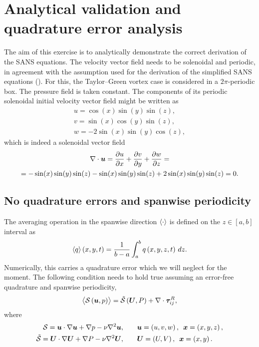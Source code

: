 \documentclass[../main.tex]{subfiles}
\begin{document}
\section{Analytical validation and quadrature error analysis}

The aim of this exercise is to analytically demonstrate the correct derivation of the SANS equations.
The velocity vector field needs to be solenoidal and periodic, in agreement with the assumption used for the derivation of the simplified SANS equations (). For this, the Taylor--Green vortex case is considered in a $2\pi$-periodic box.
The pressure field is taken constant.
The components of its periodic solenoidal initial velocity vector field might be written as
\begin{gather}
u = \cos (x) \sin (y) \sin (z), \label{eq:tg-u} \\
v = \sin (x) \cos (y) \sin (z), \\
w = -2 \sin (x) \sin (y) \cos (z),\label{eq:tg-w}
\end{gather}
which is indeed a solenoidal vector field
\begin{gather}
\nabla \cdot \boldsymbol{u} = \frac{\partial u}{\partial x}+\frac{\partial v}{\partial y}+\frac{\partial w}{\partial z}=\nonumber\\
=- \sin (x) \sin (y) \sin (z)- \sin (x) \sin (y) \sin (z)+2\sin (x) \sin (y) \sin (z)=0.
\end{gather}

\subsection{No quadrature errors and spanwise periodicity}
\label{sec:sans_analytical}

The averaging operation in the spanwise direction $\left\langle \cdot \right\rangle$ is defined on the $z\in\left[a,b\right]$ interval as
\begin{equation}
\left\langle q \right\rangle\left(x,y,t \right) = \frac{1}{b-a}\int^b_a q\left(x,y,z,t \right)\,dz.
\end{equation}
Numerically, this carries a quadrature error which we will neglect for the moment.
The following condition needs to hold true assuming an error-free quadrature and spanwise periodicity,
\begin{equation}
\left\langle \mathcal{S}\left(\boldsymbol{u}, p\right) \right\rangle = \tilde{\mathcal{S}}\left(\boldsymbol{U}, P\right) + \nabla\cdot\boldsymbol\tau_{ij}^R, \label{eq:balance}
\end{equation}
where
\begin{align}
\mathcal{S}= \boldsymbol{u}\cdot\nabla \boldsymbol{u} + \nabla p - \nu \nabla^2 \boldsymbol{u}, \qquad &\boldsymbol{u}=\left(u,v,w \right),\,\,\, \boldsymbol{x}=\left(x,y,z \right),\\
 \tilde{\mathcal{S}}= \boldsymbol{U}\cdot\nabla \boldsymbol{U} + \nabla P - \nu \nabla^2 \boldsymbol{U}, \qquad &\boldsymbol{U} = \left(U,V \right),\,\,\, \boldsymbol{x}=\left(x,y \right).
\end{align}
\end{document}
